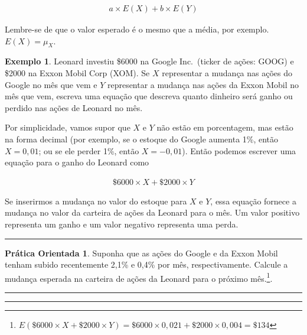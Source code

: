 \documentclass[
]{book}
\theoremstyle{definition}
\theoremstyle{definition}
\newtheorem{example}{Exemplo}[chapter]
\theoremstyle{definition}
\newtheorem{exercise}{Prática Orientada}[chapter]
\theoremstyle{definition}
\theoremstyle{remark}
\begin{document}
\begin{align*}
a\times E(X) + b\times E(Y)
\end{align*}

Lembre-se de que o valor esperado é o mesmo que a média, por exemplo. \(E(X) = \mu_X\).

\begin{example}
\protect\hypertarget{exm:unnamed-chunk-79}{}{\label{exm:unnamed-chunk-79} }Leonard investiu \$6000 na Google Inc.~(ticker de ações: GOOG) e \$2000 na Exxon Mobil Corp (XOM). Se \(X\) representar a mudança nas ações do Google no mês que vem e \(Y\) representar a mudança nas ações da Exxon Mobil no mês que vem, escreva uma equação que descreva quanto dinheiro será ganho ou perdido nas ações de Leonard no mês.
\end{example}

Por simplicidade, vamos supor que \(X\) e \(Y\) não estão em porcentagem, mas estão na forma decimal (por exemplo, se o estoque do Google aumenta 1\%, então \(X = 0,01\); ou se ele perder 1\%, então \(X = -0,01\)). Então podemos escrever uma equação para o ganho do Leonard como

\begin{align*}
\$6000\times X + \$2000\times Y
\end{align*}

Se inserirmos a mudança no valor do estoque para \(X\) e \(Y\), essa equação fornece a mudança no valor da carteira de ações da Leonard para o mês. Um valor positivo representa um ganho e um valor negativo representa uma perda.

\begin{center}\rule{0.5\linewidth}{0.5pt}\end{center}

\begin{exercise}
\protect\hypertarget{exr:expectedChangeInLeonardsStockPortfolio}{}{\label{exr:expectedChangeInLeonardsStockPortfolio} }Suponha que as ações do Google e da Exxon Mobil tenham subido recentemente 2,1\% e 0,4\% por mês, respectivamente. Calcule a mudança esperada na carteira de ações da Leonard para o próximo mês.\footnote{\(E(\$6000\times X + \$2000\times Y) = \$6000\times 0,021 + \$2000\times 0,004 = \$134\)}.
\end{exercise}

\begin{center}\rule{0.5\linewidth}{0.5pt}\end{center}

\begin{center}\rule{0.5\linewidth}{0.5pt}\end{center}
\end{document}
